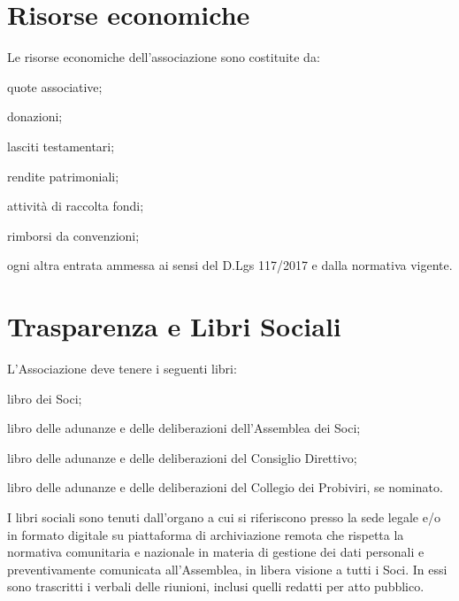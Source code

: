 \documentclass[legalpaper, 11pt]{exam}
\let\tempone\enumerate
\let\temptwo\endenumerate
\renewenvironment{enumerate}{\tempone\addtolength{\itemsep}{-0.45\baselineskip}}{\temptwo}
\begin{document}
{\section{Risorse economiche}
\begin{enumerate}
 \item Le risorse economiche dell'associazione sono costituite da:
 \vspace{-5pt}
 \begin{enumerate}
  \item quote associative;
  \item donazioni;
  \item lasciti testamentari;
  \item rendite patrimoniali;
  \item attività di raccolta fondi;
  \item rimborsi da convenzioni;
  \item ogni altra entrata ammessa ai sensi del D.Lgs 117/2017 e dalla normativa vigente.
 \end{enumerate}
\end{enumerate}


\section{Trasparenza e Libri Sociali}
\begin{enumerate}
 \item L'Associazione deve tenere i seguenti libri: 
 \vspace{-5pt}
 \begin{enumerate}
  \item libro dei Soci;
  \item libro delle adunanze e delle deliberazioni dell'Assemblea dei Soci;
  \item libro delle adunanze e delle deliberazioni del Consiglio Direttivo;
  \item libro delle adunanze e delle deliberazioni del Collegio dei Probiviri, se nominato.
 \end{enumerate}
 
 \item I libri sociali sono tenuti dall'organo a cui si riferiscono presso la sede legale e/o in formato digitale su piattaforma di archiviazione remota che rispetta la normativa comunitaria e nazionale in materia di gestione dei dati personali e preventivamente comunicata all’Assemblea, in libera visione a tutti i Soci. In essi sono trascritti i verbali delle riunioni, inclusi quelli redatti per atto pubblico.
\end{enumerate}

}
\end{document}
